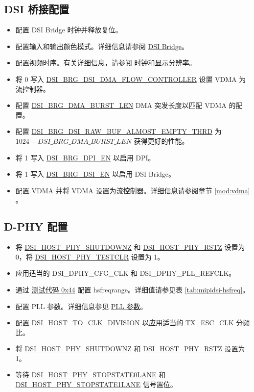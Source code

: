 \documentclass[main\_\_CN.tex]{subfiles}
\begin{document}
\subsection{DSI 桥接配置}
\label{sec:dsi-bridge-configuration}
\begin{itemize}
    \item 配置 DSI Bridge 时钟并释放复位。
    \item 配置输入和输出颜色模式。详细信息请参阅 \hyperref[sec:dsi-bridge]{DSI Bridge}。
    \item 配置视频时序。有关详细信息，请参阅 \hyperref[sec:clocks-and-display-resolution]{时钟和显示分辨率}。
    \item 将 0 写入 \hyperref[fielddesc:DSIBRGDSIDMAFLOWCONTROLLER]{DSI\_BRG\_DSI\_DMA\_FLOW\_CONTROLLER} 设置 VDMA 为流控制器。
    \item 配置 \hyperref[fielddesc:DSIBRGDMABURSTLEN]{DSI\_BRG\_DMA\_BURST\_LEN} DMA 突发长度以匹配 VDMA 的配置。
    \item 配置 \hyperref[fielddesc:DSIBRGDSIRAWBUFALMOSTEMPTYTHRD]{DSI\_BRG\_DSI\_RAW\_BUF\_ALMOST\_EMPTY\_THRD} 为 $1024 - \hyperref[fielddesc:DSIBRGDMABURSTLEN]{DSI\_BRG\_DMA\_BURST\_LEN}$ 获得更好的性能。
    \item 将 1 写入 \hyperref[fielddesc:DSIBRGDPIEN]{DSI\_BRG\_DPI\_EN} 以启用 DPI。
    \item 将 1 写入 \hyperref[fielddesc:DSIBRGDSIEN]{DSI\_BRG\_DSI\_EN} 以启用 DSI Bridge。
    \item 配置 VDMA 并将 VDMA 设置为流控制器。详细信息请参阅章节 \ref{mod:vdma} \textit{}。
\end{itemize}
\label{sec:mipidsi-dsi-bridge-programming-proc}

\subsection{D-PHY 配置}
\label{sec:mipidsi-dsi-dphy-programming-proc}
\begin{itemize}
    \item 将 \hyperref[fielddesc:DSIHOSTPHYSHUTDOWNZ]{DSI\_HOST\_PHY\_SHUTDOWNZ} 和 \hyperref[fielddesc:DSIHOSTPHYRSTZ]{DSI\_HOST\_PHY\_RSTZ} 设置为 0，将 \hyperref[fielddesc:DSIHOSTPHYTESTCLR]{DSI\_HOST\_PHY\_TESTCLR} 设置为 1。
    \item 应用适当的 DSI\_DPHY\_CFG\_CLK 和 DSI\_DPHY\_PLL\_REFCLK。
    \item 通过 \hyperref[sec:test-code-0x44]{测试代码 0x44} 配置 hsfreqrange。详细值请参见表 \ref{tab:mipidsi-hsfreq}。
    \item 配置 PLL 参数。详细信息参见 \hyperref[sec:pll-parameters]{PLL 参数}。
    \item 配置 \hyperref[fielddesc:DSIHOSTTOCLKDIVISION]{DSI\_HOST\_TO\_CLK\_DIVISION} 以应用适当的 TX\_ESC\_CLK 分频比。
    \item 将 \hyperref[fielddesc:DSIHOSTPHYSHUTDOWNZ]{DSI\_HOST\_PHY\_SHUTDOWNZ} 和 \hyperref[fielddesc:DSIHOSTPHYRSTZ]{DSI\_HOST\_PHY\_RSTZ} 设置为 1。
    \item 等待 \hyperref[fielddesc:DSIHOSTPHYSTOPSTATE0LANE]{DSI\_HOST\_PHY\_STOPSTATE0LANE} 和 \hyperref[fielddesc:DSIHOSTPHYSTOPSTATE1LANE]{DSI\_HOST\_PHY\_STOPSTATE1LANE} 信号置位。
\end{itemize}
\end{document}
